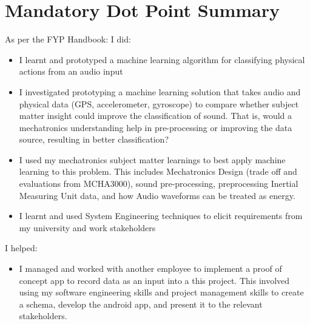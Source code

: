 \documentclass{UoNMCHA}
\numberwithin{equation}{section}
\begin{document}
\section*{Mandatory Dot Point Summary}
\vspace{-3mm}
As per the FYP Handbook: \newline
I did:
\begin{itemize}
    \item I learnt and prototyped a machine learning algorithm for classifying physical actions from an audio input
    \item I investigated prototyping a machine learning solution that takes audio and physical data (GPS, accelerometer, gyroscope) to compare whether subject matter insight could improve the classification of sound. That is, would a mechatronics understanding help in pre-processing or improving the data source, resulting in better classification?
    \item I used my mechatronics subject matter learnings to best apply machine learning to this problem. This includes Mechatronics Design (trade off and evaluations from MCHA3000), sound pre-processing, preprocessing Inertial Measuring Unit data, and how Audio waveforms can be treated as energy.
    \item I learnt and used System Engineering techniques to elicit requirements from my university and work stakeholders
\end{itemize}
I helped:
\begin{itemize}
   \item I managed and worked with another employee to implement a proof of concept app to record data as an input into a this project. This involved using my software engineering skills and project management skills to create a schema, develop the android app, and present it to the relevant stakeholders.
\end{itemize}
\newpage

\vspace{-5mm}
\end{document}
